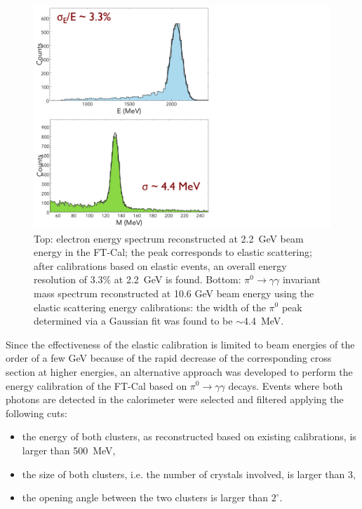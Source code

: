 \begin{figure}[t]
\centering
\includegraphics[height=1.0\columnwidth]{fig/ftcal_elasticres.pdf}
\caption{Top: electron energy spectrum reconstructed at 2.2~GeV beam energy in the FT-Cal; the peak corresponds
  to elastic scattering; after calibrations based on elastic events, an overall energy resolution of 3.3\% at 2.2~GeV is
  found. Bottom: $\pi^0\to\gamma\gamma$ invariant mass spectrum reconstructed at 10.6 GeV beam energy using the
  elastic scattering energy calibrations: the width of the $\pi^0$ peak determined via a Gaussian fit was found to be
  $\sim$4.4~MeV.}
\label{fig:ftcal_elasticres}
\end{figure}

Since the effectiveness of the elastic calibration is limited to beam energies of the order of a few GeV because of
the rapid decrease of the corresponding cross section at higher energies, an alternative approach was developed to
perform the energy calibration of the FT-Cal based on $\pi^0\to\gamma\gamma$ decays. Events where both
photons are detected in the calorimeter were selected and filtered applying the following cuts:
\begin{itemize}
    \item the energy of both clusters, as reconstructed based on existing calibrations, is larger than 500~MeV,
    \item the size of both clusters, i.e. the number of crystals involved, is larger than 3,
    \item the opening angle between the two clusters is larger than $2^\circ$.
\end{itemize}

